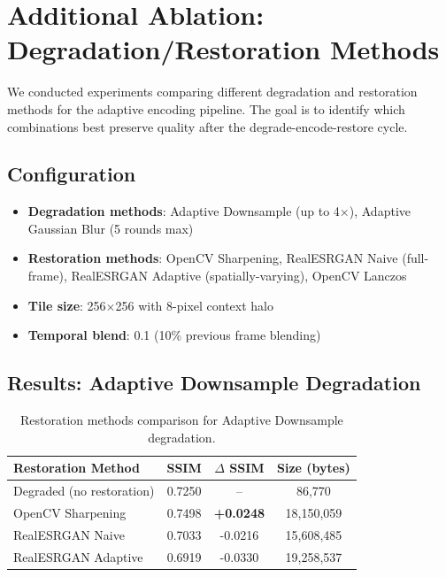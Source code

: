 \documentclass[11pt,a4paper]{article}
\begin{document}
\section{Additional Ablation: Degradation/Restoration Methods}

We conducted experiments comparing different degradation and restoration methods for the adaptive encoding pipeline. The goal is to identify which combinations best preserve quality after the degrade-encode-restore cycle.

\subsection{Configuration}
\begin{itemize}
    \item \textbf{Degradation methods}: Adaptive Downsample (up to 4$\times$), Adaptive Gaussian Blur (5 rounds max)
    \item \textbf{Restoration methods}: OpenCV Sharpening, RealESRGAN Naive (full-frame), RealESRGAN Adaptive (spatially-varying), OpenCV Lanczos
    \item \textbf{Tile size}: 256$\times$256 with 8-pixel context halo
    \item \textbf{Temporal blend}: 0.1 (10\% previous frame blending)
\end{itemize}

\subsection{Results: Adaptive Downsample Degradation}

\begin{table}[h]
\centering
\begin{tabular}{lccc}
\toprule
\textbf{Restoration Method} & \textbf{SSIM} & \textbf{$\Delta$ SSIM} & \textbf{Size (bytes)} \\
\midrule
Degraded (no restoration) & 0.7250 & -- & 86,770 \\
OpenCV Sharpening & 0.7498 & \textbf{+0.0248} & 18,150,059 \\
RealESRGAN Naive & 0.7033 & -0.0216 & 15,608,485 \\
RealESRGAN Adaptive & 0.6919 & -0.0330 & 19,258,537 \\
\bottomrule
\end{tabular}
\caption{Restoration methods comparison for Adaptive Downsample degradation.}
\label{tab:restoration}
\end{table}
\end{document}
